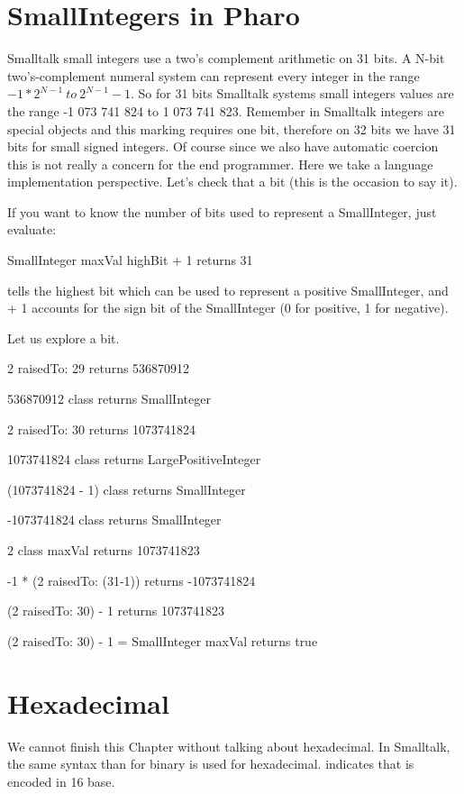 \documentclass[a4paper,10pt,twoside]{book}
\begin{document}
\section{SmallIntegers in Pharo}

Smalltalk small integers use a two's complement arithmetic on 31 bits.  A N-bit two's-complement numeral system can represent every integer in the range $-1 * 2^{N-1}\ to\ 2^{N-1}-1$. So for 31 bits Smalltalk systems small integers values are the range -1 073 741 824 to  1 073 741 823.  Remember in Smalltalk integers are special objects and this marking requires one bit, therefore on 32 bits we have 31 bits for small signed integers. Of course since we also have automatic coercion this is not really a concern for the end programmer. Here we take a language implementation perspective.
 Let's check that a bit (this is the occasion to say it). 

If you want to know the number of bits used to represent a
SmallInteger, just evaluate:

\begin{code}{}
SmallInteger maxVal highBit + 1
	returns 31
\end{code}

 tells the highest bit which can be used to
represent a positive SmallInteger, and + 1 accounts for the sign bit
of the SmallInteger (0 for positive, 1 for negative).


Let us explore a bit. 

\begin{code}{}
2 raisedTo: 29 
	returns 536870912 

536870912 class
	returns SmallInteger

2 raisedTo: 30 
	returns 1073741824

1073741824 class
	returns LargePositiveInteger
	
(1073741824 - 1) class
	returns SmallInteger

-1073741824 class 
	returns SmallInteger

2 class maxVal 
	returns 1073741823

-1 * (2 raisedTo: (31-1)) 
	returns -1073741824
	
(2 raisedTo: 30) - 1
	returns 1073741823
	
(2 raisedTo: 30) - 1 = SmallInteger maxVal	
	returns true
\end{code}

\section{Hexadecimal}
We cannot finish this Chapter without talking about hexadecimal. In Smalltalk, the same syntax than for binary is used for hexadecimal.  indicates that  is encoded in 16 base. 
\end{document}
